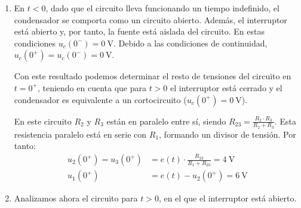 \begin{enumerate}
\item

  En $t < 0$, dado que el circuito lleva funcionando un tiempo
  indefinido, el condensador se comporta como un circuito
  abierto. Además, el interruptor está abierto y, por tanto, la fuente
  está aislada del circuito. En estas condiciones
  $u_c(0^-) = \qty{0}{\volt}$. Debido a las condiciones de
  continuidad, $u_c(0^+) = u_c(0^-) = \qty{0}{\volt}$.

\begin{minipage}{0.4\linewidth}
  Con este resultado podemos determinar el resto de tensiones del
  circuito en $t = 0^+$, teniendo en cuenta que para $t > 0$ el
  interruptor está cerrado y el condensador es equivalente a un
  cortocircuito ($u_c(0^+) = \qty{0}{\volt}$).
\end{minipage}
\hfill
\begin{minipage}{0.55\linewidth}
\end{minipage}

En este circuito $R_2$ y $R_3$ están en paralelo entre sí, siendo
$R_{23} = \frac{R_2 \cdot R_3}{R_2 + R_3}$. Esta resistencia paralelo
está en serie con $R_1$, formando un divisor de tensión. Por tanto:
\begin{align*}
  u_2(0^+) = u_3(0^+) &= e(t) \cdot \frac{R_{23}}{R_1 + R_{23}} = \qty{4}{\volt}\\
  u_1(0^+) &= e(t) - u_2(0^+) = \qty{6}{\volt}
\end{align*}

\item

  Analizamos ahora el circuito para $t > 0$, en el que el interruptor
  está abierto.



\end{enumerate}
